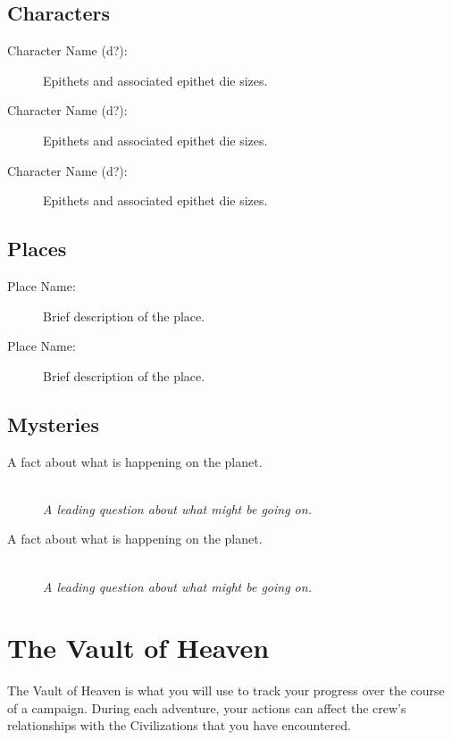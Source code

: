 \documentclass[11pt, a5paper, parskip=half-, DIV=12]{scrartcl}
\newcommand{\futura}[1]{{\setmainfont{Futura} #1}}
\begin{document}
\newpage

\subsection*{Characters}
\begin{description}
	\item[Character Name (d?):] Epithets and associated epithet die sizes.
	\item[Character Name (d?):] Epithets and associated epithet die sizes.
	\item[Character Name (d?):] Epithets and associated epithet die sizes.
\end{description}

\subsection*{Places}
\begin{description}
	\item[Place Name:] Brief description of the place.
	\item[Place Name:] Brief description of the place.
\end{description}

\subsection*{Mysteries}
\begin{description}
	\item[A fact about what is happening on the planet.] \phantom{a} \\ \textit{A leading question about what might be going on.}
	\item[A fact about what is happening on the planet.] \phantom{a} \\ \textit{A leading question about what might be going on.}
\end{description}

\newpage

\section*{The Vault of Heaven}
The Vault of Heaven is what you will use to track your progress over the course of a campaign. During each adventure, your actions can affect the crew's relationships with the Civilizations that you have encountered.

\newlength{\terranlen}
\setlength{\terranlen}{\widthof{\futura{Terran}}}
\end{document}
